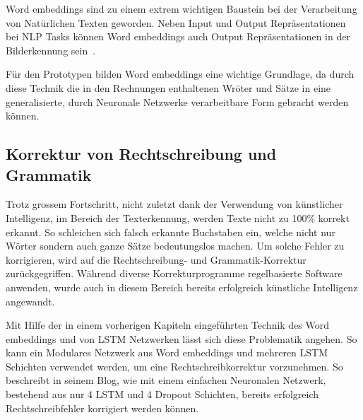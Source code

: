 Word embeddings sind zu einem extrem wichtigen Baustein bei der Verarbeitung von Natürlichen Texten geworden. Neben Input und Output Repräsentationen bei NLP Tasks können Word embeddings auch Output Repräsentationen in der Bilderkennung sein~\autocite{Olah2014b}. 

Für den Prototypen bilden Word embeddings eine wichtige Grundlage, da durch diese Technik die in den Rechnungen enthaltenen Wröter und Sätze in eine generalisierte, durch Neuronale Netzwerke verarbeitbare Form gebracht werden können.

\subsection{Korrektur von Rechtschreibung und Grammatik}

Trotz grossem Fortschritt, nicht zuletzt dank der Verwendung von künstlicher Intelligenz, im Bereich der Texterkennung, werden Texte nicht zu 100\% korrekt erkannt. So schleichen sich falsch erkannte Buchstaben ein, welche nicht nur Wörter sondern auch ganze Sätze bedeutungslos machen. Um solche Fehler zu korrigieren, wird auf die Rechtschreibung- und Grammatik-Korrektur zurückgegriffen. Während diverse Korrekturprogramme regelbasierte Software anwenden, wurde auch in diesem Bereich bereits erfolgreich künstliche Intelligenz angewandt.

Mit Hilfe der in einem vorherigen Kapiteln eingeführten Technik des Word embeddings und von LSTM Netzwerken lässt sich diese Problematik angehen. So kann ein Modulares Netzwerk aus Word embeddings und mehreren LSTM Schichten verwendet werden, um eine Rechtschreibkorrektur vorzunehmen. So beschreibt \textcite{Weiss2016} in seinem Blog, wie mit einem einfachen Neuronalen Netzwerk, bestehend aus nur 4 LSTM und 4 Dropout Schichten, bereits erfolgreich Rechtschreibfehler korrigiert werden können. 

